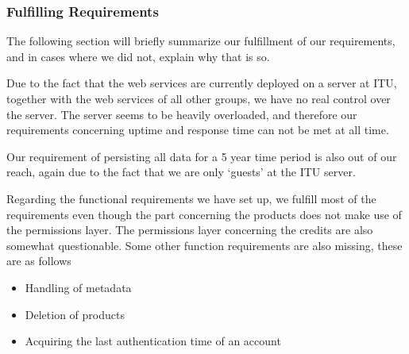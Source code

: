 \subsubsection{Fulfilling Requirements}
\label{serverfulfil}
The following section will briefly summarize our fulfillment of our requirements, and in cases where we did not, explain why that is so.

Due to the fact that the web services are currently deployed on a server at ITU, together with the web services of all other groups, we have no real control over the server. The server seems to be heavily overloaded, and therefore our requirements concerning uptime and response time can not be met at all time.

Our requirement of persisting all data for a 5 year time period is also out of our reach, again due to the fact that we are only `guests' at the ITU server.

Regarding the functional requirements we have set up, we fulfill most of the requirements even though the part concerning the products does not make use of the permissions layer. The permissions layer concerning the credits are also somewhat questionable. 
Some other function requirements are also missing, these are as follows
\begin{itemize}
\item Handling of metadata
\item Deletion of products
\item Acquiring the last authentication time of an account
\end{itemize}

